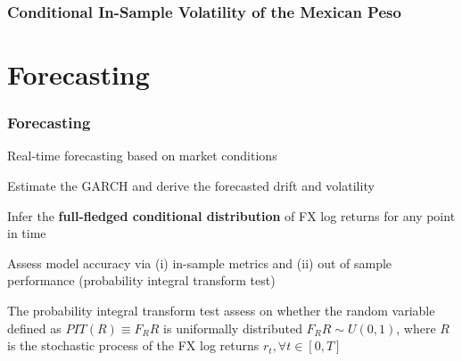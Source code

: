 \documentclass{beamer}
\newenvironment{largeitemize}{\itemize\addtolength{\itemsep}{10pt}}{\enditemize}
\begin{document}
\begin{frame}
\frametitle{Conditional In-Sample Volatility of the Mexican Peso}
\end{frame}

\section{Forecasting}

\begin{frame}
  \frametitle{Forecasting}

  \begin{largeitemize}
      \item Real-time forecasting based on market conditions
    \item Estimate the GARCH and derive the forecasted drift and volatility
    \item Infer the \textbf{full-fledged conditional distribution} of FX log returns for any point
      in time
    \item Assess model accuracy via (i) in-sample metrics and (ii) out of
      sample performance (probability integral transform test)
    \item The probability integral transform test assess on whether the random
      variable defined as $PIT(R) \equiv F_{R}R$ is uniformally distributed
      $F_{R}R \sim U(0,1)$, where $R$ is the stochastic process of the FX log returns $r_t, \forall t \in
      [0, T]$
  \end{largeitemize}
  
\end{frame}
\end{document}
